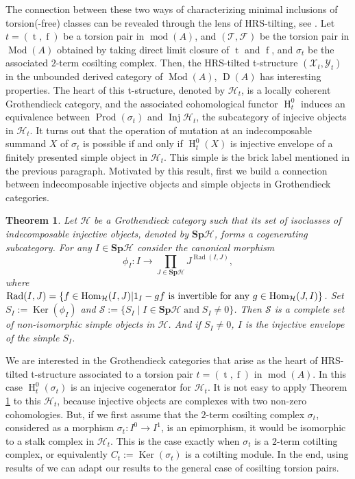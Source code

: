 \documentclass[12pt]{amsart}
\numberwithin{equation}{section}
\newtheorem{theorem}[lemma]{Theorem}
\theoremstyle{definition}
\DeclareMathOperator{\Mod}{Mod}
\DeclareMathOperator{\modd}{mod}
\DeclareMathOperator{\Hom}{Hom}
\DeclareMathOperator{\Ker}{Ker}
\DeclareMathOperator{\Inj}{Inj}
\DeclareMathOperator{\D}{D}
\DeclareMathOperator{\ts}{t}
\DeclareMathOperator{\fs}{f}
\DeclareMathOperator{\HH}{H}
\DeclareMathOperator{\Prod}{Prod}
\DeclareMathOperator{\Rad}{Rad}
\newtheorem*{theorem 0*}{Theorem}
\newtheorem*{theorem a*}{Theorem A}
\newtheorem*{theorem b*}{Theorem B}
\numberwithin{diagram}{section}
\begin{document}
The connection between these two ways of characterizing minimal inclusions of torsion(-free) classes can be revealed through the lens of HRS-tilting, see \cite{ALSV,L}.
Let $t=(\ts,\fs)$ be a torsion pair in $\modd (A)$, and $(\mathcal{T},\mathcal{F})$ be the torsion pair in $\Mod (A)$ obtained by taking direct limit closure of $\ts$ and $\fs$, and $\sigma_t$ be the associated $2$-term cosilting complex. Then, the HRS-tilted t-structure $(\mathcal{X}_t,\mathcal{Y}_t)$ in the unbounded derived category of $\Mod(A)$, $\D(A)$ has interesting properties. The heart of this t-structure, denoted by $\mathcal{H}_t$, is a locally coherent Grothendieck category, and the associated cohomological functor $\HH^0_t$ induces an equivalence between $\Prod(\sigma_t)$ and $\Inj \mathcal{H}_t$, the subcategory of injecive objects in $\mathcal{H}_t$.
It turns out that the operation of mutation at an indecomposable summand $X$ of $\sigma_t$ is possible if and only if $\HH^0_t(X)$ is injective envelope of a finitely presented simple object in $\mathcal{H}_t$. This simple is the brick label mentioned in the previous paragraph. Motivated by this result, first we build a connection between indecomposable injective objects and simple objects in Grothendieck categories.
\begin{theorem}\label{1.2}
Let $\mathcal{H}$ be a Grothendieck category such that its set of isoclasses of indecomposable injective objects, denoted by $\textbf{Sp}\mathcal{H}$, forms a cogenerating subcategory. For any $I\in\textbf{Sp}\mathcal{H}$ consider the canonical morphism
		\[\phi_I:I\longrightarrow \prod_{J\in\textbf{Sp}\mathcal{H}}J^{\Rad(I,J)},\]
where $\Rad(I,J)=\{f\in \Hom_{\mathcal{H}}(I,J)|1_I-gf \space\text{ is invertible for any }\space  g\in\Hom_\mathcal{H}(J,I)\}$. Set $S_I:=\Ker(\phi_I)$ and $\mathcal{S}:=\{S_I\mid I\in\textbf{Sp}\mathcal{H}\; \text{and}\; S_I\neq 0\}$.
Then $\mathcal{S}$ is a complete set of non-isomorphic simple objects in $\mathcal{H}$. And if $S_I\neq 0$, $I$ is the injective envelope of the simple $S_I$.
\end{theorem}

We are interested in the Grothendieck categories that arise as the heart of HRS-tilted t-structure associated to a torsion pair $t=(\ts,\fs)$ in $\modd(A)$. In this case $\HH^0_t(\sigma_t)$ is an injecive cogenerator for $\mathcal{H}_t$.
It is not easy to apply Theorem \ref{1.2} to this $\mathcal{H}_t$, because injective objects are complexes with two non-zero cohomologies.
But, if we first assume that the $2$-term cosilting complex $\sigma_t$, considered as a morphism $\sigma_t:I^0\rightarrow I^1$, is an epimorphism, it would be isomorphic to a stalk complex in $\mathcal{H}_t$.
This is the case exactly when $\sigma_t$ is a $2$-term cotilting complex, or equivalently $C_t:=\Ker(\sigma_t)$ is a cotilting module.
In the end, using results of \cite{ALS2} we can adapt our results to the general case of cosilting torsion pairs.
\end{document}
